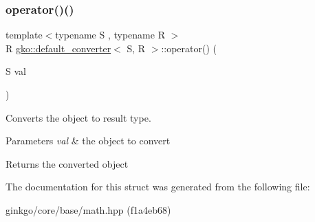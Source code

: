 \subsubsection{\texorpdfstring{operator()()}{operator()()}}
{\footnotesize\ttfamily template$<$typename S , typename R $>$ \\
R \hyperlink{structgko_1_1default__converter}{gko\+::default\+\_\+converter}$<$ S, R $>$\+::operator() (\begin{DoxyParamCaption}\item[{S}]{val }\end{DoxyParamCaption})\hspace{0.3cm}{\ttfamily [inline]}}



Converts the object to result type. 


\begin{DoxyParams}{Parameters}
{\em val} & the object to convert \\
\hline
\end{DoxyParams}
\begin{DoxyReturn}{Returns}
the converted object 
\end{DoxyReturn}


The documentation for this struct was generated from the following file\+:\begin{DoxyCompactItemize}
\item 
ginkgo/core/base/math.\+hpp (f1a4eb68)\end{DoxyCompactItemize}
